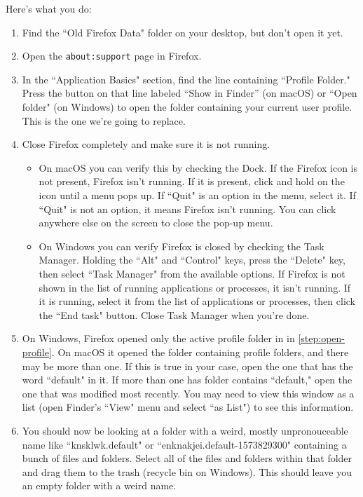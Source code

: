 \documentclass[fontsize=11pt]{article}
\begin{document}
Here's what you do:
\begin{enumerate}
	\item Find the ``Old Firefox Data" folder on your desktop, but don't open it yet.
	\item Open the \texttt{about:support} page in Firefox.
	\item \label{step:open-profile} In the ``Application Basics" section, find the line containing ``Profile Folder."  Press the button on that line labeled ``Show in Finder'' (on macOS) or ``Open folder" (on Windows) to open the folder containing your current user profile.  This is the one we're going to replace.
	\item Close Firefox completely and make sure it is not running.
	\begin{itemize}
		\item On macOS you can verify this by checking the Dock.  If the Firefox icon is not present, Firefox isn't running.  If it is present, click and hold on the icon until a menu pops up.  If ``Quit" is an option in the menu, select it.  If ``Quit" is not an option, it means Firefox isn't running.  You can click anywhere else on the screen to close the pop-up menu.
		\item On Windows you can verify Firefox is closed by checking the Task Manager.  Holding the ``Alt" and ``Control" keys, press the ``Delete" key, then select ``Task Manager" from the available options.  If Firefox is not shown in the list of running applications or processes, it isn't running.  If it is running, select it from the list of applications or processes, then click the ``End task" button.  Close Task Manager when you're done.
	\end{itemize}
	\item On Windows, Firefox opened only the active profile folder in  in \cref{step:open-profile}.  On macOS it opened the folder containing profile folders, and there may be more than one.  If this is true in your case, open the one that has the word ``default" in it.  If more than one has folder contains ``default," open the one that was modified most recently.  You may need to view this window as a list (open Finder's ``View" menu and select ``as List") to see this information.
	\item You should now be looking at a folder with a weird, mostly unpronouceable name like ``knsklwk.default" or ``enknakjei.default-1573829300" containing a bunch of files and folders.  Select all of the files and folders within that folder and drag them to the trash (recycle bin on Windows).  This should leave you an empty folder with a weird name.

\end{enumerate}
\end{document}
